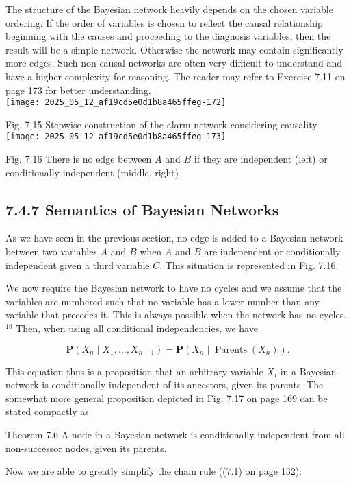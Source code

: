 \documentclass[10pt]{article}
\begin{document}
The structure of the Bayesian network heavily depends on the chosen variable ordering. If the order of variables is chosen to reflect the causal relationship beginning with the causes and proceeding to the diagnosis variables, then the result will be a simple network. Otherwise the network may contain significantly more edges. Such non-causal networks are often very difficult to understand and have a higher complexity for reasoning. The reader may refer to Exercise 7.11 on page 173 for better understanding.\\
\texttt{[image: 2025\_05\_12\_af19cd5e0d1b8a465ffeg-172]}

Fig. 7.15 Stepwise construction of the alarm network considering causality\\
\texttt{[image: 2025\_05\_12\_af19cd5e0d1b8a465ffeg-173]}

Fig. 7.16 There is no edge between $A$ and $B$ if they are independent (left) or conditionally independent (middle, right)

\subsection*{7.4.7 Semantics of Bayesian Networks}
As we have seen in the previous section, no edge is added to a Bayesian network between two variables $A$ and $B$ when $A$ and $B$ are independent or conditionally independent given a third variable $C$. This situation is represented in Fig. 7.16.

We now require the Bayesian network to have no cycles and we assume that the variables are numbered such that no variable has a lower number than any variable that precedes it. This is always possible when the network has no cycles. ${ }^{19}$ Then, when using all conditional independencies, we have

$$
\boldsymbol{P}\left(X_{n} \mid X_{1}, \ldots, X_{n-1}\right)=\boldsymbol{P}\left(X_{n} \mid \operatorname{Parents}\left(X_{n}\right)\right) .
$$

This equation thus is a proposition that an arbitrary variable $X_{i}$ in a Bayesian network is conditionally independent of its ancestors, given its parents. The somewhat more general proposition depicted in Fig. 7.17 on page 169 can be stated compactly as

Theorem 7.6 A node in a Bayesian network is conditionally independent from all non-successor nodes, given its parents.

Now we are able to greatly simplify the chain rule ((7.1) on page 132):
\end{document}
